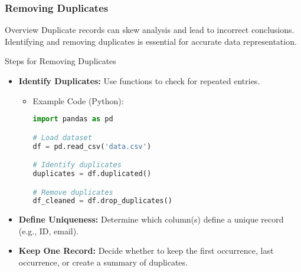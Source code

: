 \documentclass{beamer}
\begin{document}
\begin{frame}
    \frametitle{Removing Duplicates}
    \begin{block}{Overview}
        Duplicate records can skew analysis and lead to incorrect conclusions. Identifying and removing duplicates is essential for accurate data representation.
    \end{block}

    \begin{block}{Steps for Removing Duplicates}
        \begin{itemize}
            \item \textbf{Identify Duplicates:} Use functions to check for repeated entries.
            \begin{itemize}
                \item Example Code (Python):
                \begin{lstlisting}[language=Python]
import pandas as pd

# Load dataset
df = pd.read_csv('data.csv')

# Identify duplicates
duplicates = df.duplicated()

# Remove duplicates
df_cleaned = df.drop_duplicates()
                \end{lstlisting}
            \end{itemize}
            \item \textbf{Define Uniqueness:} Determine which column(s) define a unique record (e.g., ID, email).
            \item \textbf{Keep One Record:} Decide whether to keep the first occurrence, last occurrence, or create a summary of duplicates.
        \end{itemize}
    \end{block}
\end{frame}
\end{document}
